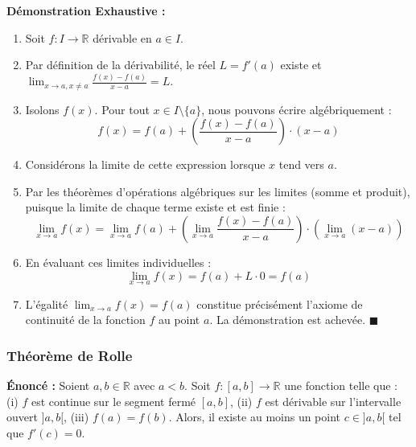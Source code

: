 \documentclass[11pt,a4paper]{article}
\begin{document}
\textbf{Démonstration Exhaustive :}
\begin{enumerate}
\item Soit $f : I \to \mathbb{R}$ dérivable en $a \in I$.
\item Par définition de la dérivabilité, le réel $L = f'(a)$ existe et $\lim_{x \to a, x \neq a} \frac{f(x) - f(a)}{x - a} = L$.
\item Isolons $f(x)$. Pour tout $x \in I \setminus \{a\}$, nous pouvons écrire algébriquement :
   \[  f(x) = f(a) + \left( \frac{f(x) - f(a)}{x - a} \right) \cdot (x - a)  \]
\item Considérons la limite de cette expression lorsque $x$ tend vers $a$.
\item Par les théorèmes d'opérations algébriques sur les limites (somme et produit), puisque la limite de chaque terme existe et est finie :
   \[  \lim_{x \to a} f(x) = \lim_{x \to a} f(a) + \left( \lim_{x \to a} \frac{f(x) - f(a)}{x - a} \right) \cdot \left( \lim_{x \to a} (x - a) \right)  \]
\item En évaluant ces limites individuelles :
   \[  \lim_{x \to a} f(x) = f(a) + L \cdot 0 = f(a)  \]
\item L'égalité $\lim_{x \to a} f(x) = f(a)$ constitue précisément l'axiome de continuité de la fonction $f$ au point $a$. La démonstration est achevée. $\blacksquare$
\end{enumerate}

\subsubsection*{Théorème de Rolle}
\textbf{Énoncé :} Soient $a, b \in \mathbb{R}$ avec $a < b$. Soit $f : [a, b] \to \mathbb{R}$ une fonction telle que :
(i) $f$ est continue sur le segment fermé $[a, b]$,
(ii) $f$ est dérivable sur l'intervalle ouvert $]a, b[$,
(iii) $f(a) = f(b)$.
Alors, il existe au moins un point $c \in ]a, b[$ tel que $f'(c) = 0$.
\end{document}
